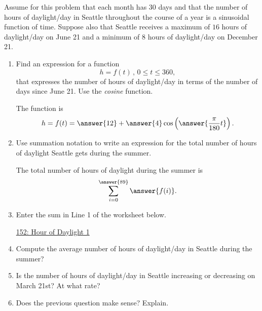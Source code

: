 \documentclass{ximera}
\begin{document}
\begin{exercise} \label{EXIIU4349se9}
Assume for this problem that each month has 30 days and that the number of hours of daylight/day in Seattle throughout the course of a year is a sinusoidal function of time. Suppose also that Seattle receives a maximum of $16$ hours of daylight/day on June 21 and a minimum of $8$ hours of daylight/day on December 21.

\begin{enumerate}
\item Find an expression for a function
\[
        h = f(t) \, , \, 0\leq t \leq 360 ,
\]
that expresses the number of hours of daylight/day in terms of the number of days since June 21. Use the \emph{cosine} function.

The function is
\[
    h = f(t) = \answer{12} + \answer{4}\cos \left(  \answer{\frac{\pi}{180}t} \right) .
\]

\item Use summation notation to write an expression for the total number of hours of daylight Seattle gets during the summer. 

The total number of hours of daylight during the summer is
\[
    \sum_{i=0}^{\answer{89}} \answer{f(i)} .
\]

\item Enter the sum in Line 1 of the worksheet below.

\begin{onlineOnly}
    \begin{center}
\end{center}
\end{onlineOnly}

\href{https://www.desmos.com/calculator/jvwyqn0vb}{152: Hour of Daylight 1}

\item Compute the average number of hours of daylight/day in Seattle during the summer?

\item Is the number of hours of daylight/day in Seattle increasing or decreasing on March 21st? At what rate?

\item Does the previous question make sense? Explain.


\end{enumerate}


\end{exercise}
\end{document}
